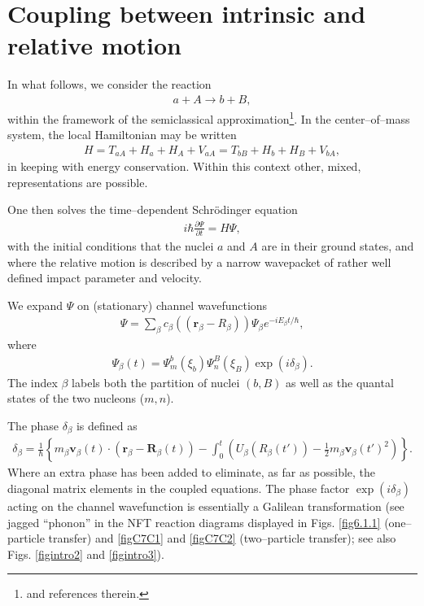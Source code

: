 \section{Coupling between intrinsic and relative motion}\label{appintroB}
In what follows, we consider the reaction
\begin{align}
a+A\rightarrow b+B,
\end{align}
within the framework of the semiclassical approximation\footnote{\cite{Broglia:04a} and references therein.}.
In the center--of--mass system, the local Hamiltonian may be written
\begin{align}\label{eqintroB2}
H=T_{aA}+H_a+H_A+V_{aA}=T_{bB}+H_b+H_B+V_{bA},
\end{align}
in keeping with energy conservation. Within this context other, mixed, representations are possible.

One then solves the time--dependent Schr\"odinger equation 
\begin{align}
i\hbar\frac{\partial \Psi}{\partial t}=H\Psi,
\end{align}
with the initial conditions that the nuclei $a$ and $A$ are in their ground states, and where the relative motion is described by a narrow wavepacket of rather well defined impact parameter and velocity.


We expand $\Psi$ on (stationary) channel wavefunctions 
\begin{align}
\Psi=\sum_{\beta}c_\beta\left(\left(\mathbf r_\beta-R_\beta\right)\right)\Psi_\beta e^{-iE_\beta t/\hbar},
\end{align}
where
\begin{align}
\Psi_\beta (t)=\Psi_m^b(\xi_b)\Psi_n^B(\xi_B)\exp(i\delta_\beta).
\end{align}
The index $\beta$ labels both the partition of nuclei $(b,B)$ as well as the quantal states of the two nucleons ($m,n$).


The phase $\delta_\beta$ is defined as
\begin{align}
\delta_\beta=\frac{1}{\hbar}\left\{m_\beta \mathbf v_\beta(t)\cdot \left(\mathbf r_\beta-\mathbf R_\beta(t)\right)-\int_0^t\left(U_\beta\left(R_\beta(t')\right)-\frac{1}{2}m_\beta\mathbf v_\beta(t')^2\right)\right\}.
\end{align}
 Where an extra phase has been added to eliminate, as far as possible, the diagonal matrix elements in the coupled equations.
The phase factor $\exp(i\delta_\beta)$ acting on the channel wavefunction is essentially a Galilean transformation (see jagged ``phonon'' in the NFT reaction diagrams displayed in Figs. \ref{fig6.1.1} (one--particle transfer) and \ref{figC7C1} and \ref{figC7C2} (two--particle transfer); see also Figs. \ref{figintro2} and \ref{figintro3}).



